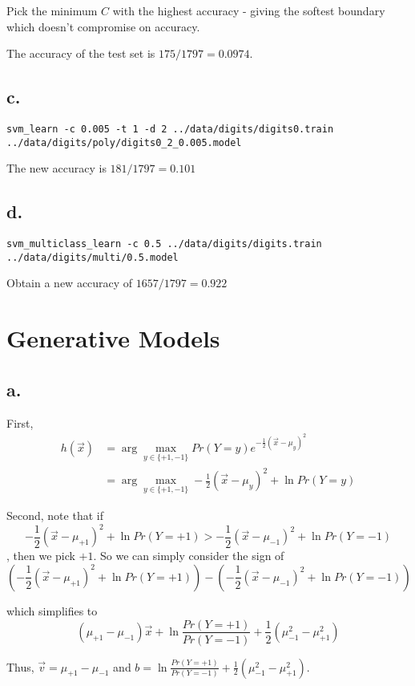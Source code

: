\documentclass[]{article}
\begin{document}
Pick the minimum $C$ with the highest accuracy - giving the softest boundary which doesn't compromise on accuracy.

The accuracy of the test set is $175/1797 = 0.0974$.

\subsection*{c.}
\begin{verbatim}
svm_learn -c 0.005 -t 1 -d 2 ../data/digits/digits0.train ../data/digits/poly/digits0_2_0.005.model
\end{verbatim}
The new accuracy is $181/1797 = 0.101$

\subsection*{d.}
\begin{verbatim}
svm_multiclass_learn -c 0.5 ../data/digits/digits.train ../data/digits/multi/0.5.model
\end{verbatim}

Obtain a new accuracy of $1657/1797 = 0.922$

\section{Generative Models}

\subsection*{a.}
First,
\begin{align*}
h(\vec x) &= \arg \max_{y \in \{+1,-1\}} Pr(Y=y)e^{-\frac{1}{2}(\vec x - \mu_{y})^2} \\
&= \arg \max_{y \in \{+1,-1\}} -\frac{1}{2}(\vec x - \mu_y)^2 + \ln Pr(Y=y)
\end{align*}

Second, note that if \[-\frac{1}{2}(\vec x - \mu_{+1})^2 + \ln Pr(Y=+1) > -\frac{1}{2}(\vec x - \mu_{-1})^2 + \ln Pr(Y=-1)\], then we pick $+1$. So we can simply consider the sign of \[\left(-\frac{1}{2}(\vec x - \mu_{+1})^2 + \ln Pr(Y=+1)\right) - \left( -\frac{1}{2}(\vec x - \mu_{-1})^2 + \ln Pr(Y=-1) \right)\]

which simplifies to \[(\mu_{+1}-\mu_{-1})\vec x + \ln \frac{Pr(Y=+1)}{Pr(Y=-1)} + \frac{1}{2}(\mu_{-1}^2 - \mu_{+1}^2)\]

Thus, $\vec v = \mu_{+1}-\mu_{-1}$ and $b = \ln \frac{Pr(Y=+1)}{Pr(Y=-1)} + \frac{1}{2}(\mu_{-1}^2 - \mu_{+1}^2)$.
\end{document}
